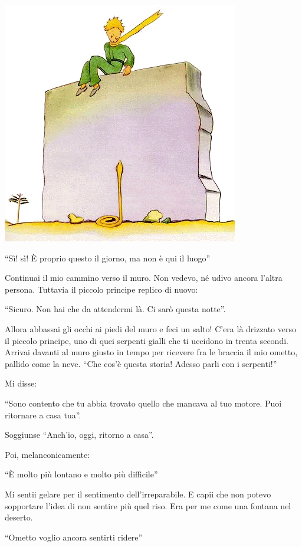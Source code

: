 \documentclass[11pt]{scrbook}
\begin{document}
\begin{center}
\includegraphics{img/26a}
\end{center}

``Sì! sì! È proprio questo il giorno, ma non è qui il luogo''

Continuai il mio cammino verso il muro. Non vedevo, né udivo ancora l'altra persona. Tuttavia il piccolo principe replico di nuovo:

``Sicuro. Non hai che da attendermi là. Ci sarò questa notte''.

Allora abbassai gli occhi ai piedi del muro e feci un salto! C'era là drizzato verso il piccolo principe, uno di quei serpenti gialli che ti uccidono in trenta secondi. Arrivai davanti al muro giusto in tempo per ricevere fra le braccia il mio ometto, pallido come la neve. ``Che cos'è questa storia! Adesso parli con i serpenti!''

Mi disse:

``Sono contento che tu abbia trovato quello che mancava al tuo motore.
Puoi ritornare a casa tua''.

Soggiunse ``Anch'io, oggi, ritorno a casa''.

Poi, melanconicamente:

``È molto più lontano e molto più difficile''

Mi sentii gelare per il sentimento dell'irreparabile. E capii che non potevo sopportare l'idea di non sentire più quel riso. Era per me come una fontana nel deserto.

``Ometto voglio ancora sentirti ridere''
\end{document}
